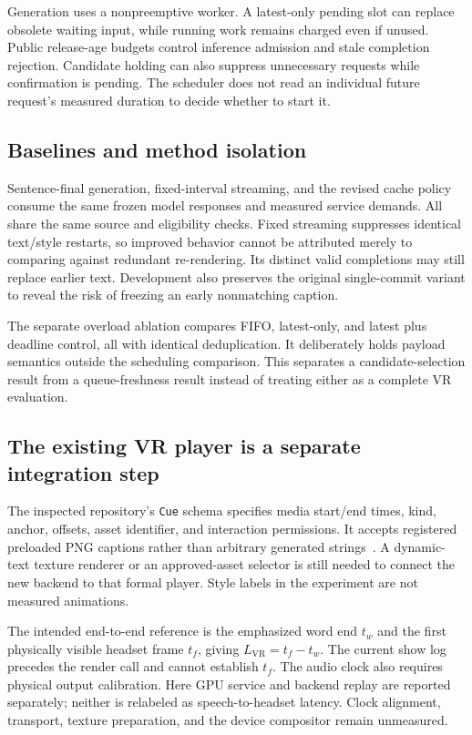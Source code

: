 Generation uses a nonpreemptive worker. A latest-only pending slot can replace obsolete waiting input, while running work remains charged even if unused. Public release-age budgets control inference admission and stale completion rejection. Candidate holding can also suppress unnecessary requests while confirmation is pending. The scheduler does not read an individual future request's measured duration to decide whether to start it.

\subsection{Baselines and method isolation}
Sentence-final generation, fixed-interval streaming, and the revised cache policy consume the same frozen model responses and measured service demands. All share the same source and eligibility checks. Fixed streaming suppresses identical text/style restarts, so improved behavior cannot be attributed merely to comparing against redundant re-rendering. Its distinct valid completions may still replace earlier text. Development also preserves the original single-commit variant to reveal the risk of freezing an early nonmatching caption.

The separate overload ablation compares FIFO, latest-only, and latest plus deadline control, all with identical deduplication. It deliberately holds payload semantics outside the scheduling comparison. This separates a candidate-selection result from a queue-freshness result instead of treating either as a complete VR evaluation.

\subsection{The existing VR player is a separate integration step}
The inspected repository's \texttt{Cue} schema specifies media start/end times, kind, anchor, offsets, asset identifier, and interaction permissions. It accepts registered preloaded PNG captions rather than arbitrary generated strings~\cite{repo}. A dynamic-text texture renderer or an approved-asset selector is still needed to connect the new backend to that formal player. Style labels in the experiment are not measured animations.

The intended end-to-end reference is the emphasized word end $t_w$ and the first physically visible headset frame $t_f$, giving $L_{\mathrm{VR}}=t_f-t_w$. The current show log precedes the render call and cannot establish $t_f$. The audio clock also requires physical output calibration. Here GPU service and backend replay are reported separately; neither is relabeled as speech-to-headset latency. Clock alignment, transport, texture preparation, and the device compositor remain unmeasured.

